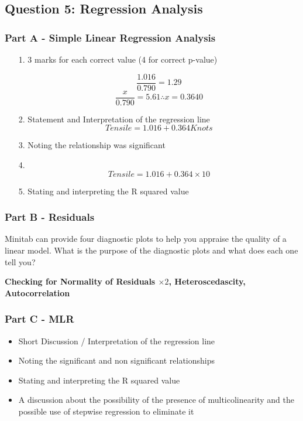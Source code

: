 \documentclass[a4paper,12pt]{article}
\begin{document}
\newpage\subsection*{Question 5: Regression Analysis}
\subsubsection*{Part A - Simple Linear Regression Analysis}
\begin{itemize}
\item[1.] 3 marks for each correct value (4 for correct p-value) 

\[\frac{1.016}{0.790} = 1.29\]
\[\frac{x}{0.790} = 5.61 \therefore x = 0.3640\]
\item[2.] Statement and Interpretation of the regression line
\[Tensile = 1.016 + 0.364 Knots\]
 
\item[3.] Noting the relationship was significant
\item[4.] \[Tensile = 1.016 + 0.364 \times 10\]
\item[5.] Stating and interpreting the R squared value 
\end{itemize}

	
\subsubsection*{Part B - Residuals}
 Minitab can provide four diagnostic plots to help you appraise the quality of a linear model.	What is the purpose of the diagnostic plots and what does each one tell you?\\ 
 \bigskip

\noindent	\textbf{Checking for Normality of Residuals $\times 2$, Heteroscedascity, Autocorrelation}
\subsubsection*{Part C - MLR}
\begin{itemize}
\item Short Discussion / Interpretation of the regression line
\item Noting the significant and non significant relationships 
\item Stating and interpreting the R squared value 
\item A discussion about the possibility of the presence of multicolinearity and the possible
use of stepwise regression to eliminate it 

\end{itemize}
\end{document}

